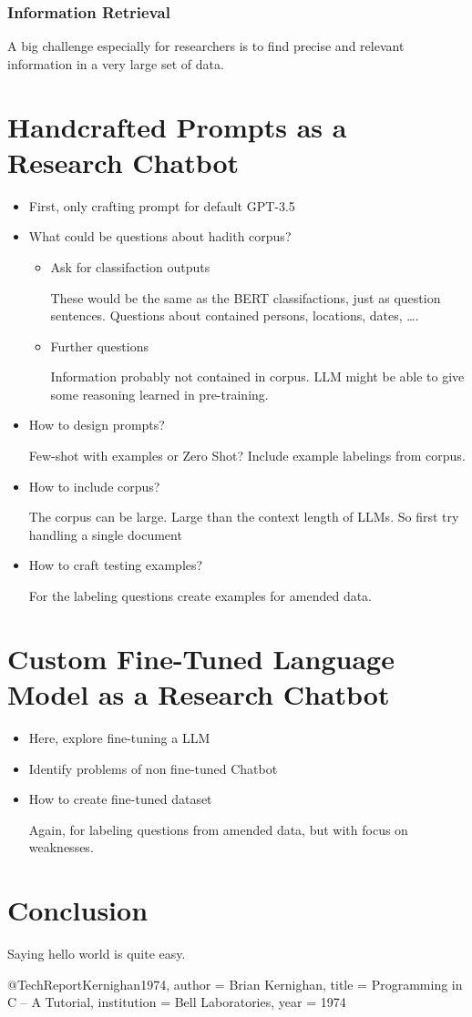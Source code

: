 \documentclass[english, version-2022-01]{uzl-thesis}
\begin{document}
\subsection{Information Retrieval}

A big challenge especially for researchers is to find precise and relevant information in a very large set of data.

\chapter{Handcrafted Prompts as a Research Chatbot}

\begin{itemize}
	\item First, only crafting prompt for default GPT-3.5
	\item What could be questions about hadith corpus?
	      \begin{itemize}
		      \item Ask for classifaction outputs

		            These would be the same as the BERT classifactions, just as question sentences. Questions about contained persons, locations, dates, \dots.
		      \item Further questions

		            Information probably not contained in corpus. LLM might be able to give some reasoning learned in pre-training.
	      \end{itemize}
	\item How to design prompts?

	      Few-shot with examples or Zero Shot? Include example labelings from corpus.
	\item How to include corpus?

	      The corpus can be large. Large than the context length of LLMs. So first try handling a single document
	\item How to craft testing examples?

	      For the labeling questions create examples for amended data.
\end{itemize}
\chapter{Custom Fine-Tuned Language Model as a Research Chatbot}
\begin{itemize}
	\item Here, explore fine-tuning a LLM
	\item Identify problems of non fine-tuned Chatbot
	\item How to create fine-tuned dataset

	      Again, for labeling questions from amended data, but with focus on weaknesses.
\end{itemize}
\chapter{Conclusion}
Saying hello world is quite easy.
\begin{bibtex-entries}
@TechReport{Kernighan1974,
	author = {Brian Kernighan},
	title = {Programming in C – A Tutorial},
	institution = {Bell Laboratories},
	year = {1974}
}
\end{bibtex-entries}
\end{document}
